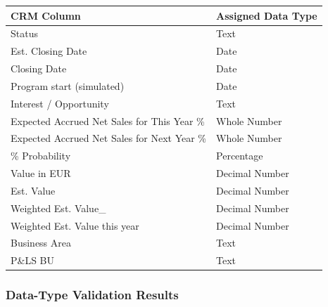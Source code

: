 \documentclass[11pt,a4paper]{article}
\begin{document}
\begin{tabularx}{\textwidth}{
    >{\ttfamily}p{7.2cm}
    X
}

\toprule

CRM Column
&
Assigned Data Type
\\

\midrule

Status
&
Text
\\

Est. Closing Date
&
Date
\\

Closing Date
&
Date
\\

Program start (simulated)
&
Date
\\

Interest / Opportunity
&
Text
\\

Expected Accrued Net Sales for This Year \%
&
Whole Number
\\

Expected Accrued Net Sales for Next Year \%
&
Whole Number
\\

\% Probability
&
Percentage
\\

Value in EUR
&
Decimal Number
\\

Est. Value
&
Decimal Number
\\

Weighted Est. Value\_
&
Decimal Number
\\

Weighted Est. Value this year
&
Decimal Number
\\

Business Area
&
Text
\\

P\&LS BU
&
Text
\\

\bottomrule

\end{tabularx}

\subsubsection*{Data-Type Validation Results}
\end{document}
